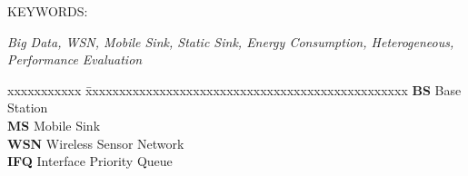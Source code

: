 \documentclass[MTech]{iitmdiss}
\begin{document}
\noindent KEYWORDS: \hspace*{0.5em} \parbox[t]{4.4in}{\textit{Big Data, WSN, Mobile Sink, Static Sink, Energy Consumption, Heterogeneous, Performance Evaluation}}

\pagebreak



\begin{singlespace}
\tableofcontents
\thispagestyle{empty}
\listoftables
{}
\listoffigures
{}
\end{singlespace}


\abbreviations

\noindent 
\begin{tabbing}
xxxxxxxxxxx \= xxxxxxxxxxxxxxxxxxxxxxxxxxxxxxxxxxxxxxxxxxxxxxxx \kill
\textbf{BS}   \> Base Station  \\
\textbf{MS} \> Mobile Sink \\
\textbf{WSN} \> Wireless Sensor Network \\
\textbf{IFQ} \> Interface Priority Queue \\
\end{tabbing}

\pagebreak





\pagebreak
\clearpage



\pagestyle{fancy}
\lhead{}
\cfoot{\thepage}
\renewcommand{\footrulewidth}{1pt}
\renewcommand{\headrulewidth}{1pt}
\setlength{\headsep}{0.5in}
\end{document}
